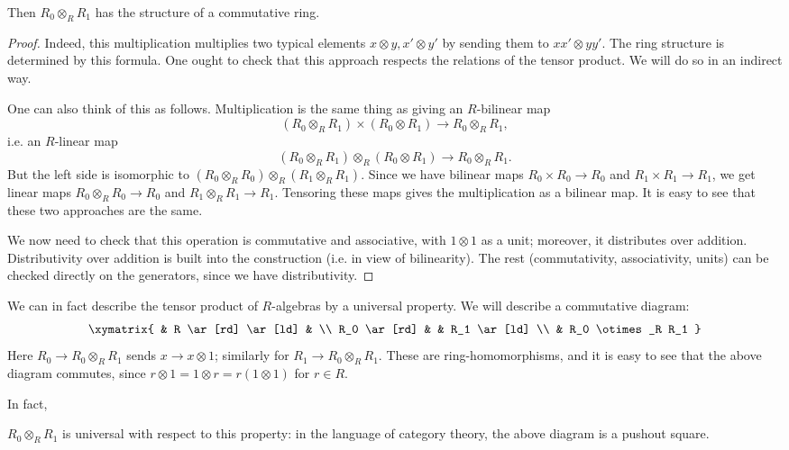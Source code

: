 \begin{proposition}
Then $R_0 \otimes_R R_1$ has the structure of a commutative ring.
\end{proposition}
\begin{proof}
 Indeed, this
multiplication multiplies two typical elements $x \otimes y, x' \otimes y'$ by
sending them to
$xx' \otimes yy'$.
The ring structure is determined by this formula.  One ought to check that this
approach respects the relations of the tensor product. We will do so in an
indirect way.

One can also think of this as follows. Multiplication is the same thing as
giving an $R$-bilinear map
\[ (R_0 \otimes_R R_1) \times (R_0 \otimes R_1) \to R_0 \otimes_R R_1,\]
i.e. an $R$-linear map
\[ (R_0 \otimes_R R_1) \otimes_R (R_0 \otimes R_1) \to R_0 \otimes_R R_1.\]
But the left side is isomorphic to $(R_0 \otimes_R R_0) \otimes_R (R_1
\otimes_R R_1)$. Since we have bilinear maps $R_0 \times R_0 \to R_0$ and $R_1
\times R_1 \to R_1$, we get linear maps
$R_0 \otimes_R R_0 \to R_0$ and $R_1 \otimes_R R_1 \to R_1$.
Tensoring these maps gives the multiplication as a bilinear map. It is easy to
see that these two approaches are the same.

We now need to check that this operation is commutative and associative, with
$1 \otimes 1$ as a unit; moreover, it distributes over addition. Distributivity
over addition is built into the construction (i.e. in view of bilinearity). The
rest (commutativity, associativity, units) can be checked directly on the
generators, since we have distributivity.
\end{proof}

We can in fact describe the tensor product of $R$-algebras by a universal
property. We will
describe a commutative diagram:
\[
\xymatrix{
& R \ar[rd] \ar[ld] & \\
R_0 \ar[rd] & & R_1 \ar[ld] \\
& R_0 \otimes_R R_1
}
\]
Here $R_0 \to R_0 \otimes_R R_1$ sends $x \to x \otimes 1$; similarly for $R_1
\to R_0 \otimes_R R_1$. These are ring-homomorphisms, and it is easy to
see that
the above
diagram commutes, since $r \otimes 1 = 1 \otimes r = r(1 \otimes 1)$ for $r \in
R$.

In fact,
\begin{proposition}
$R_0 \otimes_R R_1$ is universal with respect to this property: in the language
of category theory, the above diagram is a pushout square.
\end{proposition}


